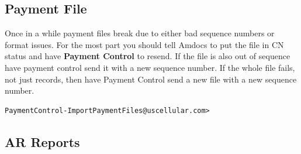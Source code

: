 \documentclass[12pt,twoside]{article}
\begin{document}
\subsection{Payment File}
\label{sec:orgheadline31}
Once in a while payment files break due to either bad sequence
numbers or format issues. For the most part you should tell
Amdocs to put the file in CN status and have \textbf{Payment Control}
to resend. If the file is also out of sequence have payment
control send it with a new sequence number. If the whole file
fails, not just records, then have Payment Control send a new
file with a new sequence number.

\begin{verbatim}
PaymentControl-ImportPaymentFiles@uscellular.com>
\end{verbatim}
\subsection{AR Reports}
\label{sec:orgheadline32}
\end{document}
